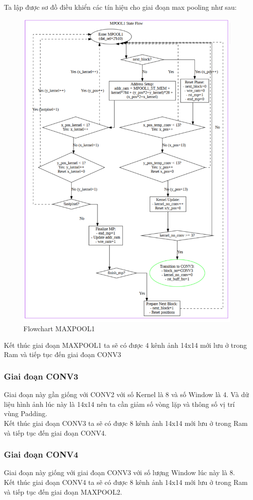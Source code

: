 Ta lập được sơ đồ điều khiển các tín hiệu cho giai đoạn max pooling như sau:

\begin{figure}[H]
    \centering
    \includegraphics[width=0.75\linewidth]{Images/mpoolflow.png}
    \caption{Flowchart MAXPOOL1}
    \label{fig:enter-label}
\end{figure}
Kết thúc giai đoạn MAXPOOL1 ta sẽ có được 4 kênh ảnh 14x14 mới lưu ở trong Ram và tiếp tục đến giai đoạn CONV3

\subsubsection{Giai đoạn CONV3}
Giai đoạn này gần giống với CONV2 với số Kernel là 8 và số Window là 4. Và dữ liệu hình ảnh lúc này là 14x14 nên ta cần giảm số vòng lặp và thông số vị trí vùng Padding.\\
Kết thúc giai đoạn CONV3 ta sẽ có được 8 kênh ảnh 14x14 mới lưu ở trong Ram và tiếp tục đến giai đoạn CONV4.

\subsubsection{Giai đoạn CONV4}
Giai đoạn này giống với giai đoạn CONV3 với số lượng Window lúc này là 8.\\
Kết thúc giai đoạn CONV4 ta sẽ có được 8 kênh ảnh 14x14 mới lưu ở trong Ram và tiếp tục đến giai đoạn MAXPOOL2.

